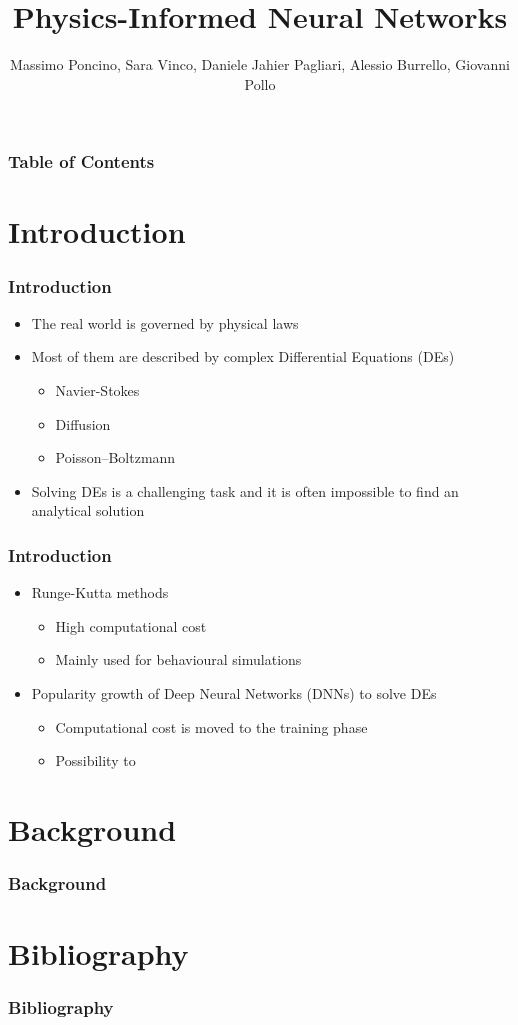 \documentclass{beamer}
\title{Physics-Informed Neural Networks}
\author{Massimo Poncino\inst{1}, Sara Vinco\inst{1}, Daniele Jahier Pagliari\inst{1}, Alessio Burrello\inst{1,}\inst{2}, Giovanni Pollo\inst{1}}
\institute[VFU] %
{
  \inst{1}%
  Politecnico di Torino
  \and
  \inst{2}%
  Alma Mater Studiorum - Università di Bologna
}
\begin{document}
\frame{\titlepage}
\begin{frame}
  \frametitle{Table of Contents}
  \tableofcontents
\end{frame}

\section{Introduction}
\begin{frame}
  \frametitle{Introduction}
  \begin{itemize}
    \item The real world is governed by physical laws
    \item Most of them are described by complex Differential Equations (DEs)
    \begin{itemize}
      \item Navier-Stokes
      \item Diffusion
      \item Poisson–Boltzmann
    \end{itemize}
    \item Solving DEs is a challenging task and it is often impossible to find an analytical solution
  \end{itemize}
\end{frame}

\begin{frame}
  \frametitle{Introduction}
  \begin{itemize}
    \item Runge-Kutta methods
    \begin{itemize}
      \item High computational cost
      \item Mainly used for behavioural simulations
    \end{itemize}
    \item Popularity growth of Deep Neural Networks (DNNs) to solve DEs \cite{deep-neural-network-for-system-of-ordinary-differential-equations-vectorized-algorithm-and-simulation}
    \begin{itemize}
      \item Computational cost is moved to the training phase
      \item Possibility to 
    \end{itemize}
  \end{itemize}
\end{frame}


\section{Background}

\begin{frame}
  \frametitle{Background}

\end{frame}

\section{Bibliography}
\begin{frame}
  \frametitle{Bibliography}
  \printbibliography
\end{frame}
\end{document}
